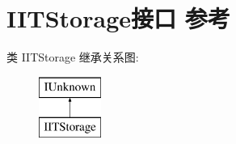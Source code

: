 \hypertarget{interface_i_i_t_storage}{}\section{I\+I\+T\+Storage接口 参考}
\label{interface_i_i_t_storage}
类 I\+I\+T\+Storage 继承关系图\+:\begin{figure}[H]
\begin{center}
\leavevmode
\includegraphics[height=2.000000cm]{interface_i_i_t_storage}
\end{center}
\end{figure}
